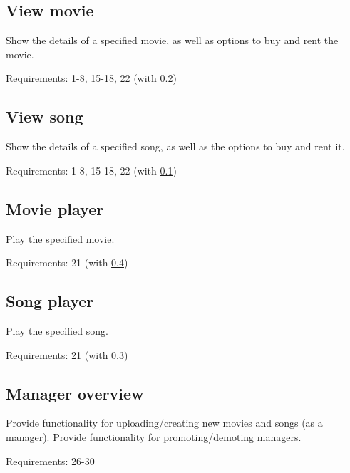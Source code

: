 \subsection{View movie}
\label{app:client-views-view-movie}
Show the details of a specified movie, as well as options to buy and rent the movie.

Requirements: 1-8, 15-18, 22 (with \ref{app:client-views-view-song})

\subsection{View song}
\label{app:client-views-view-song}
Show the details of a specified song, as well as the options to buy and rent it.

Requirements: 1-8, 15-18, 22 (with \ref{app:client-views-view-movie})

\subsection{Movie player}
\label{app:client-views-movie-player}
Play the specified movie.

Requirements:  21 (with \ref{app:client-views-song-player})

\subsection{Song player}
\label{app:client-views-song-player}
Play the specified song.

Requirements: 21 (with \ref{app:client-views-movie-player})

\subsection{Manager overview}
Provide functionality for uploading/creating new movies and songs (as a manager).
Provide functionality for promoting/demoting managers.

Requirements: 26-30

